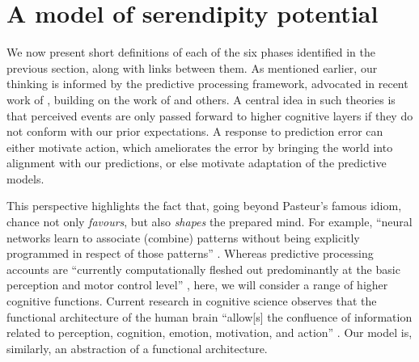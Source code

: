 \section{A model of serendipity potential} \label{sec:our-model}


We now present short definitions of each of the six phases identified
in the previous section, along with links between them.  As mentioned
earlier, our thinking is informed by the predictive processing
framework, advocated in recent work of \citet{clark2013whatever},
building on the work of \citet{friston2009free} and others.  A central
idea in such theories is that perceived events are only passed forward
to higher cognitive layers if they do not conform with our prior
expectations.  A response to prediction error can either motivate
action, which ameliorates the error by bringing the world into
alignment with our predictions, or else motivate adaptation of the
predictive models.

This perspective highlights the fact that, going beyond Pasteur's
famous idiom, chance not only \emph{favours}, but also \emph{shapes}
the prepared mind.  For example, ``neural networks learn to associate
(combine) patterns without being explicitly programmed in respect of
those patterns'' \cite[p.~137]{boden}.  Whereas predictive processing
accounts are ``currently computationally fleshed out predominantly at
the basic perception and motor control level'' \cite{KWISTHOUT201784},
here, we will consider a range of higher cognitive functions.  Current
research in cognitive science observes that the functional
architecture of the human brain ``allow[s] the confluence of
information related to perception, cognition, emotion, motivation, and
action'' \cite[p.~357]{Pessoa2017}.  Our model is, similarly, an
abstraction of a functional architecture.




